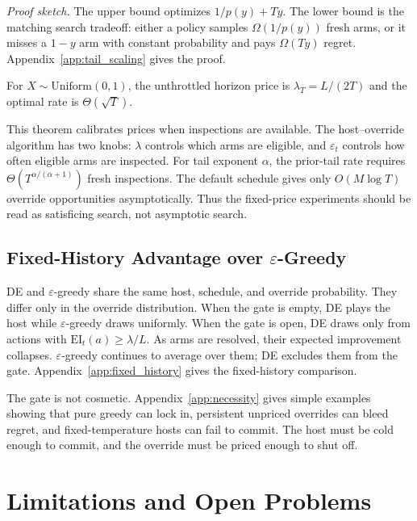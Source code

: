 \documentclass{article}
\newcommand{\EI}{\mathrm{EI}} %
\begin{document}
\noindent\textit{Proof sketch.}
The upper bound optimizes $1/p(y)+Ty$.
The lower bound is the matching search tradeoff: either a policy samples $\Omega(1/p(y))$ fresh arms, or it misses a $1-y$ arm with constant probability and pays $\Omega(Ty)$ regret.
Appendix~\ref{app:tail_scaling} gives the proof.

For $X\sim\mathrm{Uniform}(0,1)$, the unthrottled horizon price is $\lambda_T=L/(2T)$ and the optimal rate is $\Theta(\sqrt{T})$.

This theorem calibrates prices when inspections are available.
The host--override algorithm has two knobs: $\lambda$ controls which arms are eligible, and $\varepsilon_t$ controls how often eligible arms are inspected.
For tail exponent $\alpha$, the prior-tail rate requires $\Theta(T^{\alpha/(\alpha+1)})$ fresh inspections.
The default schedule gives only $O(M\log T)$ override opportunities asymptotically.
Thus the fixed-price experiments should be read as satisficing search, not asymptotic search.

\subsection{Fixed-History Advantage over $\varepsilon$-Greedy}
\label{sec:dominance}

DE and $\varepsilon$-greedy share the same host, schedule, and override probability.
They differ only in the override distribution.
When the gate is empty, DE plays the host while $\varepsilon$-greedy draws uniformly.
When the gate is open, DE draws only from actions with $\EI_t(a)\ge\lambda/L$.
As arms are resolved, their expected improvement collapses.
$\varepsilon$-greedy continues to average over them; DE excludes them from the gate.
Appendix~\ref{app:fixed_history} gives the fixed-history comparison.

The gate is not cosmetic.
Appendix~\ref{app:necessity} gives simple examples showing that pure greedy can lock in, persistent unpriced overrides can bleed regret, and fixed-temperature hosts can fail to commit.
The host must be cold enough to commit, and the override must be priced enough to shut off.



\section{Limitations and Open Problems}
\label{sec:limits}
\end{document}
